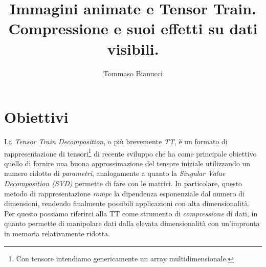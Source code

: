 \documentclass[11pt,a4paper]{article}
\title{Immagini animate e Tensor Train.\\Compressione e suoi effetti su dati visibili.}
\author{Tommaso Bianucci}
\begin{document}
\maketitle





\tableofcontents

\section{Obiettivi}
La \emph{Tensor Train Decomposition}, o più brevemente \emph{TT}, è un formato di rappresentazione di tensori\footnote{Con tensore intendiamo genericamente un array multidimensionale.} di recente sviluppo che ha come principale obiettivo quello di fornire una buona approssimazione del tensore iniziale utilizzando un numero ridotto di \emph{parametri}, analogamente a quanto la \emph{Singular Value Decomposition (SVD)} permette di fare con le matrici.
In particolare, questo metodo di rappresentazione \emph{rompe} la dipendenza esponenziale dal numero di dimensioni, rendendo finalmente possibili applicazioni con alta dimensionalità.
Per questo possiamo riferirci alla TT come strumento di \emph{compressione} di dati, in quanto permette di manipolare dati dalla elevata dimensionalità con un'impronta in memoria relativamente ridotta.
\end{document}

